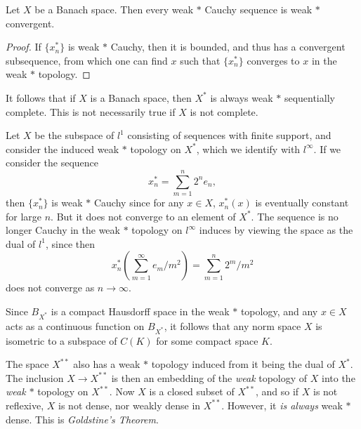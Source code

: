 \begin{corollary}
    Let $X$ be a Banach space. Then every weak $*$ Cauchy sequence is weak $*$ convergent.
\end{corollary}
\begin{proof}
    If $\{ x_n^* \}$ is weak $*$ Cauchy, then it is bounded, and thus has a convergent subsequence, from which one can find $x$ such that $\{ x_n^* \}$ converges to $x$ in the weak $*$ topology.
\end{proof}

It follows that if $X$ is a Banach space, then $X^*$ is always weak $*$ sequentially complete. This is not necessarily true if $X$ is not complete.

\begin{example}
    Let $X$ be the subspace of $l^1$ consisting of sequences with finite support, and consider the induced weak $*$ topology on $X^*$, which we identify with $l^\infty$. If we consider the sequence
    \[ x_n^* = \sum_{m = 1}^n 2^n e_n, \]
    then $\{ x_n^* \}$ is weak $*$ Cauchy since for any $x \in X$, $x_n^*(x)$ is eventually constant for large $n$. But it does not converge to an element of $X^*$. The sequence is no longer Cauchy in the weak $*$ topology on $l^\infty$ induces by viewing the space as the dual of $l^1$, since then
    \[ x_n^* \left( \sum_{m = 1}^\infty e_m / m^2 \right) = \sum_{m = 1}^n 2^m / m^2 \]
    does not converge as $n \to \infty$.
\end{example} 

Since $B_{X^*}$ is a compact Hausdorff space in the weak $*$ topology, and any $x \in X$ acts as a continuous function on $B_{X^*}$, it follows that any norm space $X$ is isometric to a subspace of $C(K)$ for some compact space $K$.

The space $X^{**}$ also has a weak $*$ topology induced from it being the dual of $X^*$. The inclusion $X \to X^{**}$ is then an embedding of the \emph{weak} topology of $X$ into the \emph{weak $*$} topology on $X^{**}$. Now $X$ is a closed subset of $X^{**}$, and so if $X$ is not reflexive, $X$ is not dense, nor weakly dense in $X^{**}$. However, it \emph{is always} weak $*$ dense. This is \emph{Goldstine's Theorem}.

